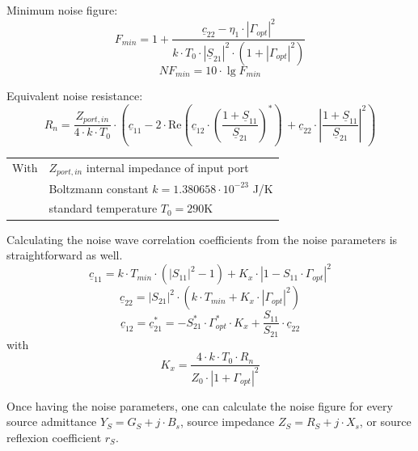 \documentclass[10pt]{report}
\begin{document}
Minimum noise figure:
\begin{equation}
F_{min} = 1 + \frac{\underline{c}_{22} - \eta_1\cdot |\Gamma_{opt}|^2}
                   {k\cdot T_0\cdot |\underline{S}_{21}|^2\cdot (1+|\Gamma_{opt}|^2)}
\end{equation}
\begin{equation}
NF_{min} = 10\cdot \lg F_{min}
\end{equation}

\addvspace{12pt}

Equivalent noise resistance:
\begin{equation}
R_n = \frac{Z_{port,in}}{4\cdot k\cdot T_0}\cdot
      \left( \underline{c}_{11} - 2\cdot
      \text{Re}\left( \underline{c}_{12}\cdot\left( \frac{1+\underline{S}_{11}}{\underline{S}_{21}} \right)^*
      \right)\, + \underline{c}_{22}\cdot
      \left| \frac{1+\underline{S}_{11}}{\underline{S}_{21}} \right|^2 \right)
\label{eqn:nparamRn}
\end{equation}
\begin{tabular}{ll}
With & \quad $Z_{port,in}$ internal impedance of input port\\
     & \quad Boltzmann constant $k = 1.380658\cdot 10^{-23}$ J/K\\
     & \quad standard temperature $T_0 = 290$K\\
\end{tabular}

\addvspace{12pt}

Calculating the noise wave correlation coefficients from the noise
parameters is straightforward as well.
\begin{equation}
\underline{c}_{11} = k\cdot T_{min}\cdot (|S_{11}|^2-1) + K_x\cdot |1-S_{11}\cdot\Gamma_{opt}|^2
\end{equation}
\begin{equation}
\underline{c}_{22} = |S_{21}|^2\cdot\left( k\cdot T_{min} + K_x\cdot|\Gamma_{opt}|^2 \right)
\end{equation}
\begin{equation}
\underline{c}_{12} =
\underline{c}_{21}^* = -S_{21}^*\cdot\Gamma_{opt}^*\cdot K_x + \frac{S_{11}}{S_{21}}\cdot\underline{c}_{22}
\end{equation}
with
\begin{equation}
K_x = \frac{4\cdot k\cdot T_0\cdot R_n}{Z_0\cdot|1+\Gamma_{opt}|^2}
\end{equation}


Once having the noise parameters, one can calculate the noise figure for
every source admittance $Y_S=G_S+j\cdot B_s$, source impedance
$Z_S=R_S+j\cdot X_s$, or source reflexion coefficient $r_S$.
\end{document}
